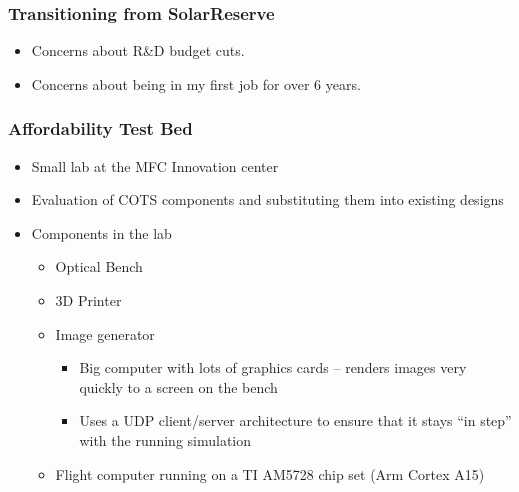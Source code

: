 \documentclass[aspectratio=169]{beamer}
\begin{document}
\begin{frame}
  \frametitle{Transitioning from SolarReserve}
  \begin{itemize}
  \item Concerns about R\&D budget cuts.
  \item Concerns about being in my first job for over 6 years.
  \end{itemize}
\end{frame}

\begin{frame}
  \frametitle{Affordability Test Bed}
  \begin{itemize}
  \item Small lab at the MFC Innovation center
  \item Evaluation of COTS components and substituting them into
    existing designs
  \item Components in the lab
    \begin{itemize}
    \item Optical Bench
    \item 3D Printer
    \item Image generator
      \begin{itemize}
        \item Big computer with lots of graphics cards --
          renders images very quickly to a screen on the bench
        \item Uses a UDP client/server architecture to ensure that it
          stays ``in step'' with the running simulation
      \end{itemize}
    \item Flight computer running on a TI AM5728 chip set (Arm Cortex A15)
    \end{itemize}
  \end{itemize}
\end{frame}
\end{document}

